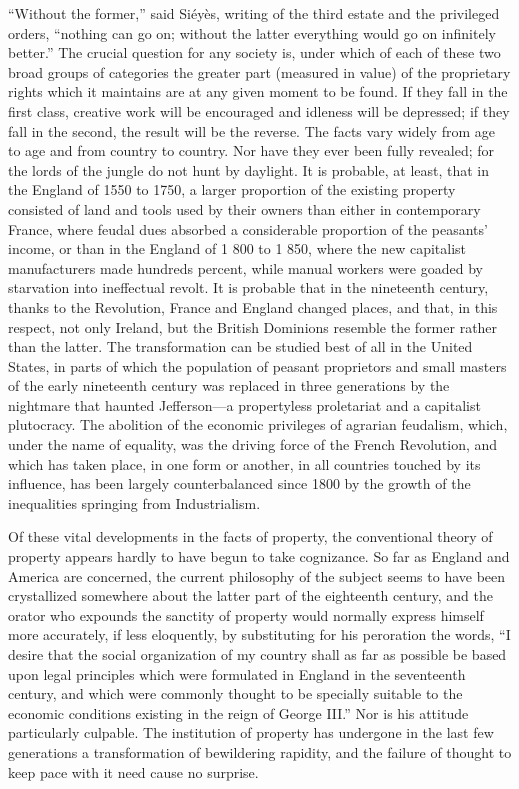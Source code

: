 \documentclass{book}
\begin{document}
“Without the former,” said Siéyès, writing of the third estate and the privileged orders, “nothing can go on; without the latter everything would go on infinitely better.” The crucial question for any society is, under which of each of these two broad groups of categories the greater part (measured in value) of the proprietary rights which it maintains are at any given moment to be found. If they fall in the first class, creative work will be encouraged and idleness will be depressed; if they fall in the second, the result will be the reverse. The facts vary widely from age to age and from country to country. Nor have they ever been fully revealed; for the lords of the jungle do not hunt by daylight. It is probable, at least, that in the England of 1550 to 1750, a larger proportion of the existing property consisted of land and tools used by their owners than either in contemporary France, where feudal dues absorbed a considerable proportion of the peasants’ income, or than in the England of 1 800 to 1 850, where the new capitalist manufacturers made hundreds percent, while manual workers were goaded by starvation into ineffectual revolt. It is probable that in the nineteenth century, thanks to the Revolution, France and England changed places, and that, in this respect, not only Ireland, but the British Dominions resemble the former rather than the latter. The transformation can be studied best of all in the United States, in parts of which the population of peasant proprietors and small masters of the early nineteenth century was replaced in three generations by the nightmare that haunted Jefferson\footnotemark[2]—a propertyless proletariat and a capitalist plutocracy. The abolition of the economic privileges of agrarian feudalism, which, under the name of equality, was the driving force of the French Revolution, and which has taken place, in one form or another, in all countries touched by its influence, has been largely counterbalanced since 1800 by the growth of the inequalities springing from Industrialism.

Of these vital developments in the facts of property, the conventional theory of property appears hardly to have begun to take cognizance. So far as England and America are concerned, the current philosophy of the subject seems to have been crystallized somewhere about the latter part of the eighteenth century, and the orator who expounds the sanctity of property would normally express himself more accurately, if less eloquently, by substituting for his peroration the words, “I desire that the social organization of my country shall as far as possible be based upon legal principles which were formulated in England in the seventeenth century, and which were commonly thought to be specially suitable to the economic conditions existing in the reign of George III.” Nor is his attitude particularly culpable. The institution of property has undergone in the last few generations a transformation of bewildering rapidity, and the failure of thought to keep pace with it need cause no surprise.
\end{document}
